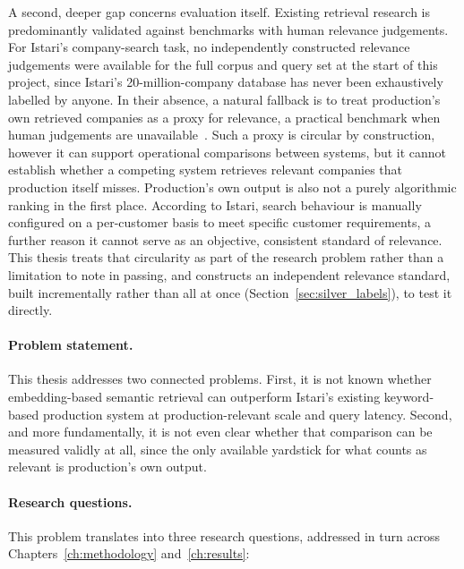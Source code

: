 \documentclass[a4paper,oneside,bibliography=totoc]{scrbook}
\begin{document}
A second, deeper gap concerns evaluation itself. Existing retrieval research is predominantly validated against benchmarks with human relevance judgements. For Istari's company-search task, no independently constructed relevance judgements were available for the full corpus and query set at the start of this project, since Istari's 20-million-company database has never been exhaustively labelled by anyone. In their absence, a natural fallback is to treat production's own retrieved companies as a proxy for relevance, a practical benchmark when human judgements are unavailable~\citep{voorhees2002philosophy, thakur2021beir}. Such a proxy is circular by construction, however it can support operational comparisons between systems, but it cannot establish whether a competing system retrieves relevant companies that production itself misses. Production's own output is also not a purely algorithmic ranking in the first place. According to Istari, search behaviour is manually configured on a per-customer basis to meet specific customer requirements, a further reason it cannot serve as an objective, consistent standard of relevance. This thesis treats that circularity as part of the research problem rather than a limitation to note in passing, and constructs an independent relevance standard, built incrementally rather than all at once (Section~\ref{sec:silver_labels}), to test it directly.

\paragraph{Problem statement.} This thesis addresses two connected problems. First, it is not known whether embedding-based semantic retrieval can outperform Istari's existing keyword-based production system at production-relevant scale and query latency. Second, and more fundamentally, it is not even clear whether that comparison can be measured validly at all, since the only available yardstick for what counts as relevant is production's own output.

\paragraph{Research questions.} This problem translates into three research questions, addressed in turn across Chapters~\ref{ch:methodology} and~\ref{ch:results}:
\end{document}
